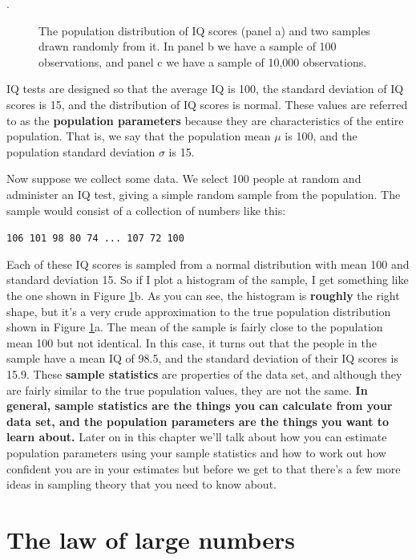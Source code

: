 \documentclass[
]{book}
\makeatletter
\newcommand*\pandocbounded[1]{%
  \sbox\pandoc@box{#1}%
  \Gscale@div\@tempa{\textheight}{\dimexpr\ht\pandoc@box+\dp\pandoc@box\relax}%
  \Gscale@div\@tempb{\linewidth}{\wd\pandoc@box}%
  \ifdim\@tempb\p@<\@tempa\p@\let\@tempa\@tempb\fi%
  \ifdim\@tempa\p@<\p@\scalebox{\@tempa}{\usebox\pandoc@box}%
  \else\usebox{\pandoc@box}%
  \fi%
}
\makeatother
\begin{document}
.

\begin{figure}
\centering
\pandocbounded{\texttt{[image: figures/navIQ.png]}}
\caption{\label{fig:IQdist}The population distribution of IQ scores (panel a) and two samples drawn randomly from it. In panel b we have a sample of 100 observations, and panel c we have a sample of 10,000 observations.}
\end{figure}

IQ tests are designed so that the average IQ is 100, the standard deviation of IQ scores is 15, and the distribution of IQ scores is normal. These values are referred to as the \textbf{population parameters} because they are characteristics of the entire population. That is, we say that the population mean \(\mu\) is 100, and the population standard deviation \(\sigma\) is 15.

Now suppose we collect some data. We select 100 people at random and administer an IQ test, giving a simple random sample from the population. The sample would consist of a collection of numbers like this:

\texttt{106\ 101\ 98\ 80\ 74\ ...\ 107\ 72\ 100}

Each of these IQ scores is sampled from a normal distribution with mean 100 and standard deviation 15. So if I plot a histogram of the sample, I get something like the one shown in Figure \ref{fig:IQdist}b. As you can see, the histogram is \textbf{roughly} the right shape, but it's a very crude approximation to the true population distribution shown in Figure \ref{fig:IQdist}a. The mean of the sample is fairly close to the population mean 100 but not identical. In this case, it turns out that the people in the sample have a mean IQ of 98.5, and the standard deviation of their IQ scores is 15.9. These \textbf{sample statistics} are properties of the data set, and although they are fairly similar to the true population values, they are not the same. \textbf{In general, sample statistics are the things you can calculate from your data set, and the population parameters are the things you want to learn about.} Later on in this chapter we'll talk about how you can estimate population parameters using your sample statistics and how to work out how confident you are in your estimates but before we get to that there's a few more ideas in sampling theory that you need to know about.

\section{The law of large numbers}\label{the-law-of-large-numbers}
\end{document}
